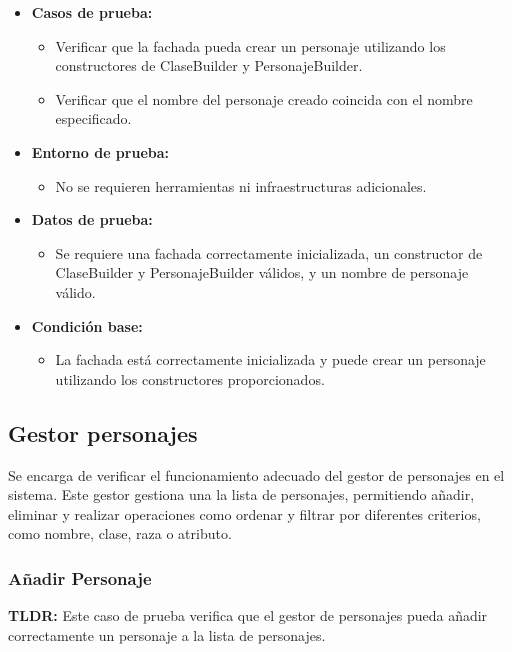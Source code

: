 \documentclass{article}
\begin{document}
\begin{itemize}
	\item \textbf{Casos de prueba:}
	\begin{itemize}
		\item Verificar que la fachada pueda crear un personaje utilizando los constructores de ClaseBuilder y PersonajeBuilder.
		\item Verificar que el nombre del personaje creado coincida con el nombre especificado.
	\end{itemize}
	
	\item \textbf{Entorno de prueba:}
	\begin{itemize}
		\item No se requieren herramientas ni infraestructuras adicionales.
	\end{itemize}
	
	\item \textbf{Datos de prueba:}
	\begin{itemize}
		\item Se requiere una fachada correctamente inicializada, un constructor de ClaseBuilder y PersonajeBuilder válidos, y un nombre de personaje válido.
	\end{itemize}
	
	\item \textbf{Condición base:}
	\begin{itemize}
		\item La fachada está correctamente inicializada y puede crear un personaje utilizando los constructores proporcionados.
	\end{itemize}
\end{itemize}

\subsection{Gestor personajes}
Se encarga de verificar el funcionamiento adecuado del gestor de personajes en el sistema. Este gestor gestiona una la lista de personajes, permitiendo añadir, eliminar y realizar operaciones como ordenar y filtrar por diferentes criterios, como nombre, clase, raza o atributo.

\subsubsection{Añadir Personaje}
\textbf{TLDR:} Este caso de prueba verifica que el gestor de personajes pueda añadir correctamente un personaje a la lista de personajes.
\end{document}
